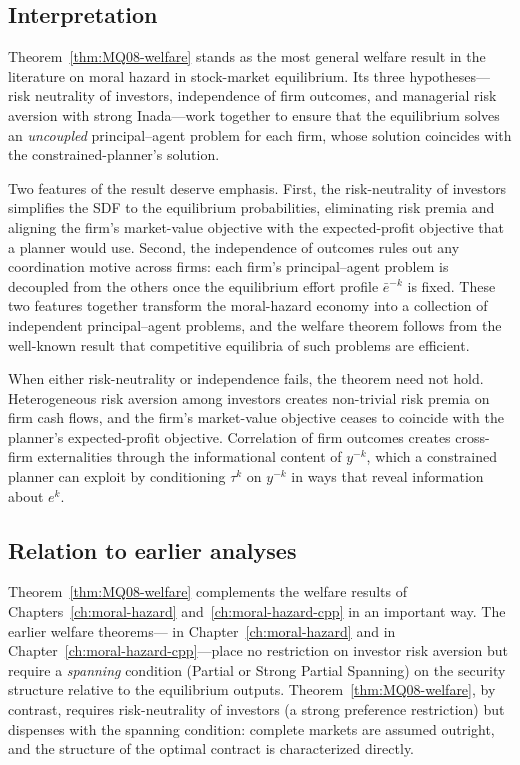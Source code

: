 \documentclass[11pt,a4paper,oneside]{book}
\theoremstyle{plain}
\theoremstyle{definition}
\theoremstyle{remark}
\numberwithin{equation}{chapter}
\begin{document}
\subsection{Interpretation}

Theorem~\ref{thm:MQ08-welfare} stands as the most general welfare result in the literature on moral hazard in stock-market equilibrium.
Its three hypotheses---risk neutrality of investors, independence of firm outcomes, and managerial risk aversion with strong Inada---work together to ensure that the equilibrium solves an \emph{uncoupled} principal--agent problem for each firm, whose solution coincides with the constrained-planner's solution.

Two features of the result deserve emphasis.
First, the risk-neutrality of investors simplifies the SDF to the equilibrium probabilities, eliminating risk premia and aligning the firm's market-value objective with the expected-profit objective that a planner would use.
Second, the independence of outcomes rules out any coordination motive across firms: each firm's principal--agent problem is decoupled from the others once the equilibrium effort profile $\bar{e}^{-k}$ is fixed.
These two features together transform the moral-hazard economy into a collection of independent principal--agent problems, and the welfare theorem follows from the well-known result that competitive equilibria of such problems are efficient.

When either risk-neutrality or independence fails, the theorem need not hold.
Heterogeneous risk aversion among investors creates non-trivial risk premia on firm cash flows, and the firm's market-value objective ceases to coincide with the planner's expected-profit objective.
Correlation of firm outcomes creates cross-firm externalities through the informational content of $y^{-k}$, which a constrained planner can exploit by conditioning $\tau^k$ on $y^{-k}$ in ways that reveal information about $e^k$.

\subsection{Relation to earlier analyses}

Theorem~\ref{thm:MQ08-welfare} complements the welfare results of Chapters~\ref{ch:moral-hazard} and~\ref{ch:moral-hazard-cpp} in an important way.
The earlier welfare theorems---\citet{MagillQuinzii2002} in Chapter~\ref{ch:moral-hazard} and \citet{BisinGottardiRuta2015} in Chapter~\ref{ch:moral-hazard-cpp}---place no restriction on investor risk aversion but require a \emph{spanning} condition (Partial or Strong Partial Spanning) on the security structure relative to the equilibrium outputs.
Theorem~\ref{thm:MQ08-welfare}, by contrast, requires risk-neutrality of investors (a strong preference restriction) but dispenses with the spanning condition: complete markets are assumed outright, and the structure of the optimal contract is characterized directly.
\end{document}
